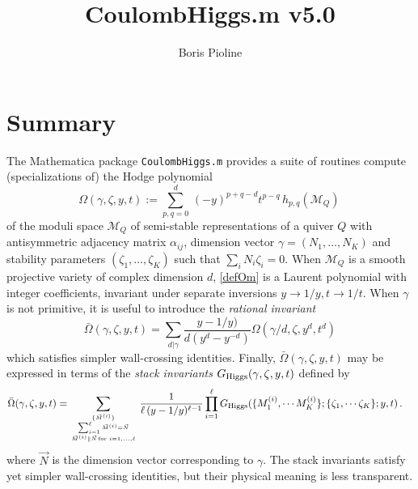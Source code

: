 \documentclass[12pt]{article}
\title{CoulombHiggs.m v5.0}
\author{Boris Pioline}
\newcommand{\be}{\begin{equation}}
\newcommand{\ee}{\end{equation}}
\newcommand\bOm{\bar\Omega}
\newcommand{\cM}{\mathcal{M}}
\newcommand{\gR}{G_{\rm Higgs}}
\begin{document}
\maketitle

\baselineskip 15pt

\tableofcontents

\medskip

\section{Summary}

The  {\sc Mathematica} package {\tt CoulombHiggs.m} provides a suite of routines compute (specializations of) the Hodge polynomial 
\be
\label{defOm}
\Omega(\gamma,\zeta,y,t) := 
\sum_{p,q=0}^{d}\, (-y)^{p+q-d} t^{p-q}\, h_{p,q}(\cM_Q)\, 
\ee
of the moduli space $\cM_Q$ of semi-stable representations of a quiver $Q$ with antisymmetric
adjacency matrix $\alpha_{ij}$,  dimension vector $\gamma=(N_1,\dots, N_K)$ and stability parameters $(\zeta_1,\dots, \zeta_K)$ such that $\sum_i N_i \zeta_i=0$. When $\cM_Q$ is 
a smooth projective variety of complex dimension $d$, \eqref{defOm} is a Laurent polynomial  with integer coefficients, invariant under separate inversions $y\to 1/y, t\to 1/t$. When $\gamma$ is not primitive, it is useful to introduce the {\it rational invariant}
\be
\label{defbOm}
\bOm(\gamma,\zeta,y,t)=\sum_{d|\gamma} \frac{y-1/y)}{d(y^d-y^{-d})} \Omega(\gamma/d,\zeta,y^d,t^d)\ee 
which satisfies simpler wall-crossing identities. Finally, $\bOm(\gamma,\zeta,y,t)$ may be expressed 
in terms of the {\it stack invariants} $G_{\rm Higgs}(\gamma,\zeta,y,t)$ defined by \cite[(4.1)]{Manschot:2013rx}
\be
\label{eq:inversestackinv}
\begin{split}
\bOm(\gamma,\zeta,y,t) 
  =& %
  \sum_{\{\vec M^{(i)}\} \atop {
  \sum_{i=1}^\ell \vec M^{(i)}=\vec N \atop  \vec M^{(i)}\parallel \vec N
  \,\mathrm{for}\,\, i=1,\dots,\ell}}
\frac{1}{\ell\,(y-1/y)^{\ell-1}}  
\prod_{i=1}^\ell 
\gR(\{ M^{(i)}_1, \cdots M^{(i)}_K \};
\{\zeta_1, \cdots \zeta_K\};y,t)
\, .  
\end{split}
\ee
where $\vec N$ is the dimension vector corresponding to $\gamma$. The stack invariants 
satisfy yet simpler wall-crossing identities, but their physical meaning is less transparent.

\medskip
\end{document}
